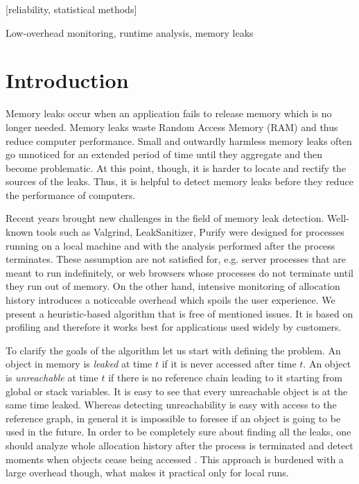 \documentclass[preprint, numbers]{sigplanconf}
\newcommand{\todo}[1]{{\color{red}{(TODO: #1)}}}
\begin{document}
[reliability, statistical methods]

\terms

\keywords
Low-overhead monitoring, runtime analysis, memory leaks

\section{Introduction}

Memory leaks occur when an application fails to release memory which is no longer needed.
Memory leaks waste Random Access Memory (RAM) and thus reduce computer performance.
Small and outwardly harmless memory leaks often go unnoticed for an extended period
of time until they aggregate and then become problematic.
At this point, though, it is harder to locate and rectify the sources of the leaks.
Thus, it is helpful to detect memory leaks before they reduce the performance of computers.

Recent years brought new challenges in the field of memory leak detection.
Well-known tools such as Valgrind, LeakSanitizer, Purify \cite{valgrind, leak-san, purify} were designed
for processes running on a local machine and with the analysis
performed after the process terminates.
These assumption are not satisfied for, e.g. server processes
that are meant to run indefinitely, or web browsers whose processes
do not terminate until they run out of memory.
On the other hand, intensive monitoring of allocation history
introduces a noticeable overhead which spoils the user experience.
We present a heuristic-based algorithm that is free of mentioned issues.
It is based on profiling and therefore it works best for applications used widely
by customers.

To clarify the goals of the algorithm let us start with defining the problem.
An object in memory is \textit{leaked} at time $t$ if it is never accessed
after time $t$.
An object is \textit{unreachable} at time $t$ if there is no reference chain
leading to it starting from global or stack variables.
It is easy to see that every unreachable object is at the same time leaked.
Whereas detecting unreachability is easy with access to the reference graph,
in general it is impossible to foresee if an object is going to be used in the future.
In order to be completely sure about finding all the leaks, one should analyze whole
allocation history after the process is terminated and detect moments when objects cease being accessed
\todo{any profiler working like this?}.
This approach is burdened with a large overhead though, what makes it practical only
for local runs.
\end{document}
